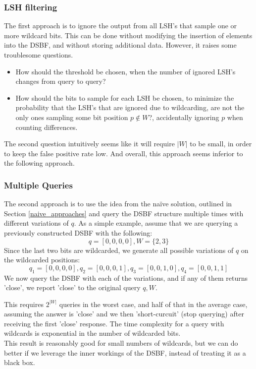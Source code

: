 \documentclass[a4paper,11pt]{article}
\begin{document}
\subsubsection*{LSH filtering}
 The first approach is to ignore the output from all LSH's that sample one or more wildcard bits. This can be done without modifying the insertion of elements into the DSBF, and without storing additional data. However, it raises some troublesome questions.

\begin{itemize}
\item How should the threshold be chosen, when the number of ignored LSH's changes from query to query?
\item How should the bits to sample for each LSH be chosen, to minimize the probability that the LSH's that are ignored due to wildcarding, are not the only ones sampling some bit position $p \notin W$?, accidentally ignoring $p$ when counting differences.
\end{itemize}

The second question intuitively seems like it will require $|W|$ to be small, in order to keep the false positive rate low. And overall, this approach seems inferior to the following approach.

\subsubsection*{Multiple Queries}
The second approach is to use the idea from the naïve solution, outlined in Section \ref{naive_approaches} and query the DSBF structure multiple times with different variations of $q$. As a simple example, assume that we are querying a previously constructed DSBF with the following:
\[q=[0,0,0,0], W=\{2,3\}\]
Since the last two bits are wildcarded, we generate all possible variations of $q$ on the wildcarded positions:
\[q_1=[0,0,0,0], q_2=[0,0,0,1], q_3=[0,0,1,0], q_4=[0,0,1,1]\]
We now query the DSBF with each of the variations, and if any of them returns 'close', we report 'close' to the original query $q, W$.

This requires $2^{|W|}$ queries in the worst case, and half of that in the average case, assuming the answer is 'close' and we then 'short-curcuit' (stop querying) after receiving the first 'close' response. The time complexity for a query with wildcards is exponential in the number of wildcarded bits.\\

This result is reasonably good for small numbers of wildcards, but we can do better if we leverage the inner workings of the DSBF, instead of treating it as a black box.\\
\end{document}
